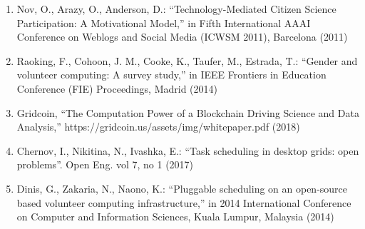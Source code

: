 \documentclass[
]{article}
\begin{document}
\begin{enumerate}
  Internet of Things and Cyber-Physical Systems,'' in 2016 IEEE
  Trustcom/BigDataSE/ISPA (2016)\\
\item
  Nov, O., Arazy, O., Anderson, D.: ``Technology-Mediated Citizen
  Science Participation: A Motivational Model,'' in Fifth International
  AAAI Conference on Weblogs and Social Media (ICWSM 2011), Barcelona
  (2011)\\
\item
  Raoking, F., Cohoon, J. M., Cooke, K., Taufer, M., Estrada, T.:
  ``Gender and volunteer computing: A survey study,'' in IEEE Frontiers
  in Education Conference (FIE) Proceedings, Madrid (2014)\\
\item
  Gridcoin, ``The Computation Power of a Blockchain Driving Science and
  Data Analysis,'' https://gridcoin.us/assets/img/whitepaper.pdf
  (2018)\\
\item
  Chernov, I., Nikitina, N., Ivashka, E.: ``Task scheduling in desktop
  grids: open problems''. Open Eng. vol 7, no 1 (2017)\\
\item
  Dinis, G., Zakaria, N., Naono, K.: ``Pluggable scheduling on an
  open-source based volunteer computing infrastructure,'' in 2014
  International Conference on Computer and Information Sciences, Kuala
  Lumpur, Malaysia (2014)
\end{enumerate}
\end{document}
